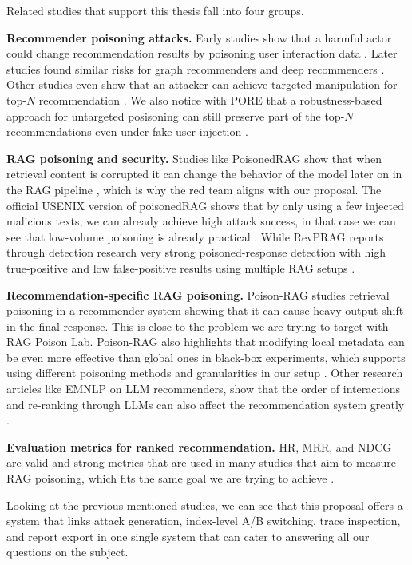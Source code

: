Related studies that support this thesis fall into four groups.

\textbf{Recommender poisoning attacks.} Early studies show that a harmful actor could change recommendation results by poisoning user interaction data \cite{li2016factorizationpoison}. Later studies found similar risks for graph recommenders and deep recommenders \cite{fang2018graphpoison,huang2021deeppoison}. Other studies even show that an attacker can achieve targeted manipulation for top-$N$ recommendation \cite{fang2020influencepoison}.
We also notice with PORE that a robustness-based approach for untargeted posisoning can still preserve part of the top-$N$ recommendations even under fake-user injection \cite{jia2023pore}.

\textbf{RAG poisoning and security.} Studies like PoisonedRAG show that when retrieval content is corrupted it can change the behavior of the model later on in the RAG pipeline \cite{zou2024poisonedrag,zhang2025corruptrag}, which is why the red team aligns with our proposal.
The official USENIX version of poisonedRAG  shows that by only using a few injected malicious texts, we can already achieve high attack success, in that case we can see that low-volume poisoning is already practical \cite{zou2025poisonedrag_usenix}. While RevPRAG reports through detection research very strong poisoned-response detection with high true-positive and low false-positive results using multiple RAG setups \cite{tan2025revprag}.

\textbf{Recommendation-specific RAG poisoning.} Poison-RAG studies retrieval poisoning in a recommender system showing that it can cause heavy output shift in the final response\cite{nazary2025poisonrag}. This is close to the problem we are trying to target with RAG Poison Lab.
Poison-RAG also highlights that modifying local metadata can be even more effective than global ones in black-box experiments, which supports using different poisoning methods and granularities in our setup \cite{nazary2025poisonrag}. Other research articles like EMNLP on LLM recommenders, show that the order of interactions and re-ranking through LLMs can also affect the recommendation system greatly \cite{wang2024elmrec}.

\textbf{Evaluation metrics for ranked recommendation.} HR, MRR, and NDCG are valid and strong metrics that are used in many studies that aim to measure RAG poisoning, which fits the same goal we are trying to achieve \cite{herlocker2004evaluating,wang2013ndcg}.

Looking at the previous mentioned studies, we can see that this proposal offers a system that links attack generation, index-level A/B switching, trace inspection, and report export in one single system that can cater to answering all our questions on the subject.


